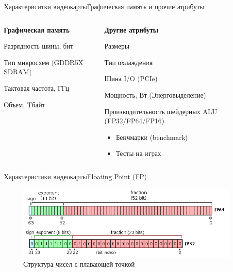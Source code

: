 \documentclass{beamer}
\begin{document}
\begin{frame}{Характериситки видеокарты}{Графическая память и прочие атрибуты}
	\begin{columns}
		\begin{column}{0.5\textwidth}
			\textbf{Графическая память}
			
			Разрядность шины, бит
			
			Тип микросхем (GDDR5X SDRAM)
			
			Тактовая частота, ГГц
			
			Объем, Tбайт
		\end{column}
		\begin{column}{0.5\textwidth}
			\textbf{Другие атрибуты}
			
			Размеры
			
			Тип охлаждения
			
			Шина I/O (PCIe)
			
			Мощность, Вт (Энерговыделение)
			
			Производительность шейдерных  ALU (FP32/FP64/FP16)
			\begin{itemize}
				\item 
				Бенчмарки (benchmark)
				\item 
				Тесты на играх
			\end{itemize}
			
		\end{column}
	\end{columns}
\end{frame}


\begin{frame}{ Характеристики видеокарты}{Floating Point (FP)}
	\begin{figure} 
		\includegraphics[width=\textwidth]{images/Floating_Point_structure.png}
		\caption {Структура чисел с плавающей точкой}
	\end{figure}
	
\end{frame}
\end{document}
